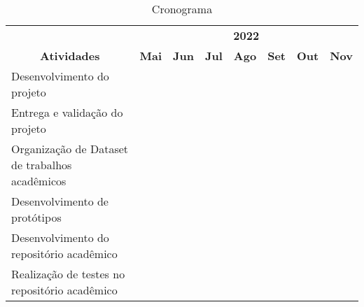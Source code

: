 \begin{table}[H]
      \caption{Cronograma}
      \begin{tabular}{|p{7cm}|l|l|l|l|l|l|l|}
            \hline
            \multicolumn{1}{|c|}{}                                      & \multicolumn{7}{c|}{\textbf{2022}}                                                                                                                                                                   \\ \cline{2-8}
            \multicolumn{1}{|c|}{\multirow{-2}{*}{\textbf{Atividades}}} & \textbf{Mai}                       & \textbf{Jun}             & \textbf{Jul}             & \textbf{Ago}             & \textbf{Set}             & \textbf{Out}             & \textbf{Nov}             \\ \hline
            Desenvolvimento do projeto                                  & \cellcolor[HTML]{000000}           & \cellcolor[HTML]{000000} &                          &                          &                          &                          &                          \\ \hline
            Entrega e validação do projeto                              &                                    & \cellcolor[HTML]{000000} & \cellcolor[HTML]{C0C0C0} &                          &                          &                          &                          \\ \hline
            Organização de Dataset de trabalhos acadêmicos              &                                    &                          & \cellcolor[HTML]{C0C0C0} &                          &                          &                          &                          \\ \hline
            Desenvolvimento de protótipos                               &                                    &                          & \cellcolor[HTML]{C0C0C0} & \cellcolor[HTML]{C0C0C0} &                          &                          &                          \\ \hline
            Desenvolvimento do repositório acadêmico                    &                                    &                          & \cellcolor[HTML]{C0C0C0} & \cellcolor[HTML]{C0C0C0} & \cellcolor[HTML]{C0C0C0} & \cellcolor[HTML]{C0C0C0} &                          \\ \hline
            Realização de testes no repositório acadêmico               &                                    &                          &                          & \cellcolor[HTML]{C0C0C0} & \cellcolor[HTML]{C0C0C0} & \cellcolor[HTML]{C0C0C0} & \cellcolor[HTML]{C0C0C0} \\ \hline

\end{tabular}
\end{table}
